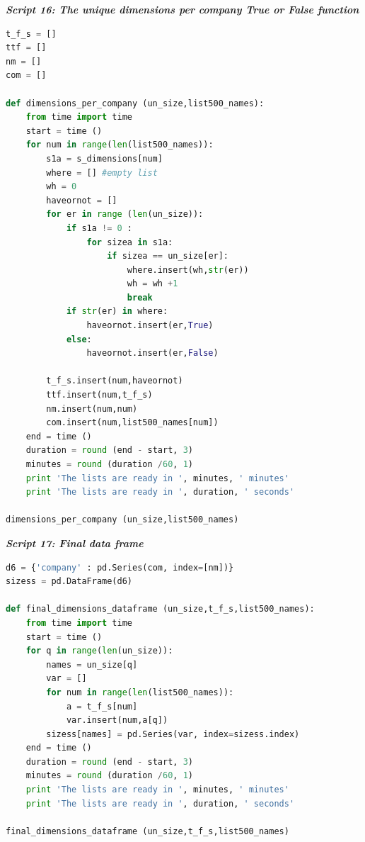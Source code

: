 \documentclass{book}
\begin{document}
\begin{center}
\textit{\textbf{Script 16: The unique dimensions per company True or False function}}\label{p16}
\end{center}
\begin{lstlisting}[language=Python]
t_f_s = []
ttf = []
nm = []
com = []

def dimensions_per_company (un_size,list500_names):
    from time import time     
    start = time ()
    for num in range(len(list500_names)): 
        s1a = s_dimensions[num] 
        where = [] #empty list
        wh = 0
        haveornot = []
        for er in range (len(un_size)):
            if s1a != 0 :
                for sizea in s1a:
                    if sizea == un_size[er]:
                        where.insert(wh,str(er))
                        wh = wh +1
                        break
            if str(er) in where:
                haveornot.insert(er,True)                    
            else:
                haveornot.insert(er,False)
                    
        t_f_s.insert(num,haveornot)
        ttf.insert(num,t_f_s)
        nm.insert(num,num)
        com.insert(num,list500_names[num])
    end = time ()
    duration = round (end - start, 3)
    minutes = round (duration /60, 1)
    print 'The lists are ready in ', minutes, ' minutes'
    print 'The lists are ready in ', duration, ' seconds'

dimensions_per_company (un_size,list500_names)
\end{lstlisting}

\begin{center}
\textit{\textbf{Script 17: Final data frame }}\label{p17}
\end{center}
\begin{lstlisting}[language=Python]
d6 = {'company' : pd.Series(com, index=[nm])}
sizess = pd.DataFrame(d6)   

def final_dimensions_dataframe (un_size,t_f_s,list500_names):
    from time import time 
    start = time ()
    for q in range(len(un_size)):
        names = un_size[q]
        var = []
        for num in range(len(list500_names)):
            a = t_f_s[num]
            var.insert(num,a[q])
        sizess[names] = pd.Series(var, index=sizess.index) 
    end = time ()
    duration = round (end - start, 3)
    minutes = round (duration /60, 1)
    print 'The lists are ready in ', minutes, ' minutes'
    print 'The lists are ready in ', duration, ' seconds'

final_dimensions_dataframe (un_size,t_f_s,list500_names)
\end{lstlisting}
\end{document}
